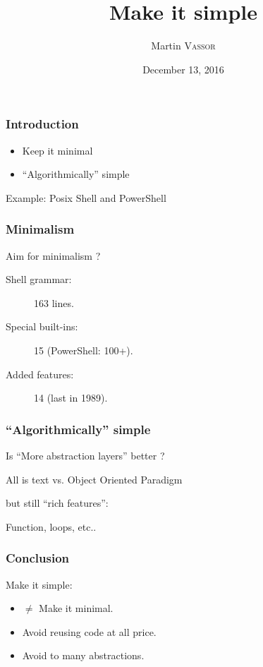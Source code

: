 \documentclass{beamer}
\title{Make it simple}
\author{Martin \textsc{Vassor}}
\institute{EPFL}
\date{December 13, 2016}
\begin{document}
\begin{frame}
	\titlepage
\end{frame}

\begin{frame}
	\frametitle{Introduction}
	\begin{itemize}
		\item Keep it minimal
		\item ``Algorithmically'' simple
	\end{itemize}
	Example: Posix Shell and PowerShell
\end{frame}

\begin{frame}
	\frametitle{Minimalism}	
	Aim for minimalism ?
	\begin{description}
		\item [Shell grammar: ] 163 lines.
		\item [Special built-ins: ] 15 (PowerShell: 100+).
		\item [Added features: ] 14 (last in 1989).
	\end{description}
\end{frame}

\begin{frame}
	\frametitle{``Algorithmically'' simple}
	Is ``More abstraction layers'' better ?
	\vfill
	\begin{center}
		All is text vs. Object Oriented Paradigm
	\end{center}
	but still ``rich features'': 
	\begin{center}
		Function, loops, etc..
	\end{center}
\end{frame}

\begin{frame}
	\frametitle{Conclusion}
	Make it simple: 
	\begin{itemize}
		\item $\neq$ Make it minimal.
		\item Avoid reusing code at all price.
		\item Avoid to many abstractions.
	\end{itemize}
\end{frame}
\end{document}
